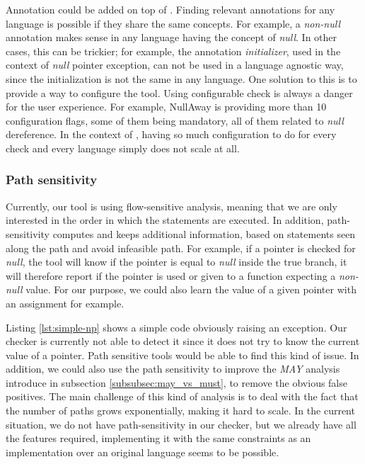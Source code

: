 Annotation could be added on top of \slang{}.
Finding relevant annotations for any language is possible if they share the same concepts. 
For example, a \emph{non-null} annotation makes sense in any language having the concept of \emph{null}. 
In other cases, this can be trickier; for example, the annotation \emph{initializer}, used in the context of \emph{null} pointer exception, can not be used in a language agnostic way, since the initialization is not the same in any language.\newline
One solution to this is to provide a way to configure the tool. 
Using configurable check is always a danger for the user experience. For example, NullAway is providing more than 10 configuration flags, some of them being mandatory, all of them related to \emph{null} dereference. 
In the context of \slang{}, having so much configuration to do for every check and every language simply does not scale at all.

\subsubsection{Path sensitivity}
\label{subsubsec:path_sensitivity}

Currently, our tool is using flow-sensitive analysis, meaning that we are only interested in the order in which the statements are executed.
In addition, path-sensitivity computes and keeps additional information, based on statements seen along the path and avoid infeasible path. 
For example, if a pointer is checked for \emph{null}, the tool will know if the pointer is equal to \emph{null} inside the true branch, it will therefore report if the pointer is used or given to a function expecting a \emph{non-null} value.
For our purpose, we could also learn the value of a given pointer with an assignment for example.



Listing \ref{lst:simple-np} shows a simple code obviously raising an exception. Our checker is currently not able to detect it since it does not try to know the current value of a pointer.
Path sensitive tools would be able to find this kind of issue.
In addition, we could also use the path sensitivity to improve the \emph{MAY} analysis introduce in subsection \ref{subsubsec:may_vs_must}, to remove the obvious false positives. 
The main challenge of this kind of analysis is to deal with the fact that the number of paths grows exponentially, making it hard to scale. 
In the current situation, we do not have path-sensitivity in our checker, but we already have all the features required, implementing it with the same constraints as an implementation over an original language seems to be possible.

